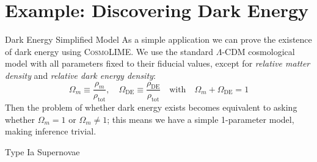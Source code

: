 \documentclass[aspectratio=43,xcolor=svgnames]{beamer} %
\begin{document}
\section{Example: Discovering Dark Energy}
\begin{frame}{Dark Energy Simplified Model}
As a simple application we can prove the existence of dark energy using \textsc{CosmoLIME}. We use the standard $\Lambda$-CDM cosmological model with all parameters fixed to their fiducial values, except for \emph{relative matter density} and \emph{relative dark energy density}:
\begin{equation*}
    \Omega_m \equiv \frac{\rho_m}{\rho_{\text{tot}}}, \quad \Omega_{\text{DE}} \equiv \frac{\rho_{\text{DE}}}{\rho_{\text{tot}}} \quad \text{with} \quad \Omega_m+\Omega_{\text{DE}} = 1
\end{equation*}
\pause
Then the problem of whether dark energy exists becomes equivalent to asking whether $\Omega_m=1$ or $\Omega_m\neq 1$; this means we have a simple 1-parameter model, making inference trivial.
\end{frame}

\begin{frame}{Type Ia Supernovae}
\end{frame}
\end{document}
